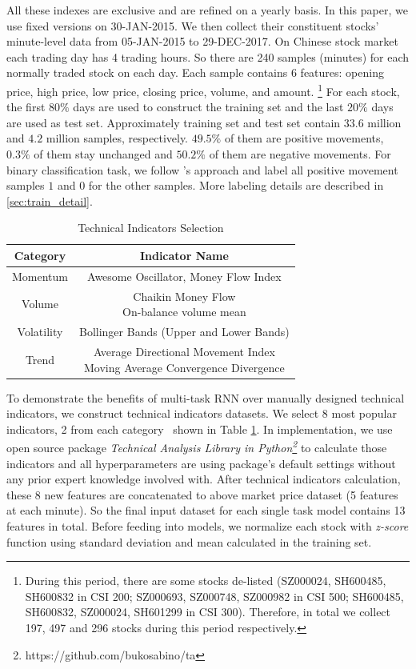 All these indexes are exclusive and are refined on a yearly
basis. In this paper, we use fixed versions on 30-JAN-2015. We
then collect their constituent stocks' minute-level data from
05-JAN-2015 to 29-DEC-2017. On Chinese stock market each trading
day has 4 trading hours. So there are 240 samples (minutes) for
each normally traded stock on each day. Each sample contains 6
features: opening price, high price, low price, closing price,
volume, and amount. \footnote{During this period, there are some
  stocks de-listed (SZ000024, SH600485, SH600832 in CSI 200;
  SZ000693, SZ000748, SZ000982 in CSI 500; SH600485, SH600832,
  SZ000024, SH601299 in CSI 300). Therefore, in total we collect
  197, 497 and 296 stocks during this period respectively.} For
each stock, the first $80\%$ days are used to construct the
training set and the last $20\%$ days are used as test set.
Approximately training set and test set contain $33.6$ million
and $4.2$ million samples, respectively. $49.5\%$ of them are
positive movements, $0.3\%$ of them stay unchanged and $50.2\%$
of them are negative movements. For binary classification task,
we follow 's approach and
label all positive movement samples $1$ and $0$ for the other
samples. More labeling details are described in
\ref{sec:train_detail}.

\begin{table}[H]
\centering
\small
\caption{Technical Indicators Selection}
\begin{tabular}{|c|c|} \hline
  Category&Indicator Name\\ \hline
  Momentum& Awesome Oscillator, Money Flow Index\\ \hline
  Volume& \makecell{Chaikin Money Flow\\ On-balance volume mean}\\ \hline
  Volatility& Bollinger Bands (Upper and Lower Bands)\\ \hline
  Trend& \makecell{Average Directional Movement Index\\Moving Average Convergence Divergence}\\ \hline
\end{tabular}
  \label{tab:ta}
\end{table}
To demonstrate the benefits of multi-task RNN over manually designed
technical indicators, we construct technical
indicators datasets. We select 8 most popular indicators, 2 from each
category~\cite{kirkpatrick2010technical} shown in Table
\ref{tab:ta}. In implementation, we use open source package
\emph{Technical Analysis Library in
  Python\footnote{https://github.com/bukosabino/ta}} to calculate
those indicators and all hyperparameters are using package's
default settings without any prior expert knowledge involved
with. After technical indicators calculation, these 8 new
features are concatenated to above market price dataset (5
features at each minute). So the final input dataset for each
single task model contains 13 features in total. Before feeding
into models, we normalize each stock with \emph{z-score} function
using standard deviation and mean calculated in the training set.

